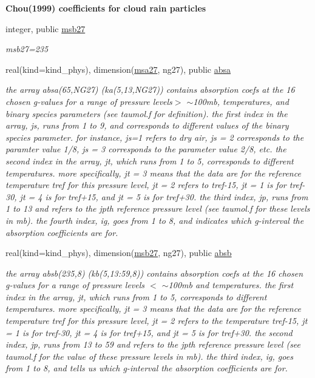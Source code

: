 \begin{Indent}\textbf{ Chou(1999) coefficients for cloud rain particles}\par
\begin{DoxyCompactItemize}
\item 
integer, public \hyperlink{group__module__radsw__kgbnn_ga3b2e57a0d4596aead5cad5aaca74850d}{msb27}
\begin{DoxyCompactList}\small\item\em msb27=235 \end{DoxyCompactList}\item 
real(kind=kind\+\_\+phys), dimension(\hyperlink{namespacemodule__radsw__kgb27_abdab838f66aba14b64bce733f797cf26}{msa27}, ng27), public \hyperlink{group__module__radsw__kgbnn_gaaf6ba2ea0beacba67c045a10d7a6a782}{absa}
\begin{DoxyCompactList}\small\item\em the array absa(65,\+N\+G27) (ka(5,13,\+N\+G27)) contains absorption coefs at the 16 chosen g-\/values for a range of pressure levels$>$ $\sim$100mb, temperatures, and binary species parameters (see taumol.\+f for definition). the first index in the array, js, runs from 1 to 9, and corresponds to different values of the binary species parameter. for instance, js=1 refers to dry air, js = 2 corresponds to the paramter value 1/8, js = 3 corresponds to the parameter value 2/8, etc. the second index in the array, jt, which runs from 1 to 5, corresponds to different temperatures. more specifically, jt = 3 means that the data are for the reference temperature tref for this pressure level, jt = 2 refers to tref-\/15, jt = 1 is for tref-\/30, jt = 4 is for tref+15, and jt = 5 is for tref+30. the third index, jp, runs from 1 to 13 and refers to the jpth reference pressure level (see taumol.\+f for these levels in mb). the fourth index, ig, goes from 1 to 8, and indicates which g-\/interval the absorption coefficients are for. \end{DoxyCompactList}\item 
real(kind=kind\+\_\+phys), dimension(\hyperlink{group__module__radsw__kgbnn_ga3b2e57a0d4596aead5cad5aaca74850d}{msb27}, ng27), public \hyperlink{group__module__radsw__kgbnn_ga8edb349c908e6950e0d18f293dd1b6ea}{absb}
\begin{DoxyCompactList}\small\item\em the array absb(235,8) (kb(5,13\+:59,8)) contains absorption coefs at the 16 chosen g-\/values for a range of pressure levels $<$ $\sim$100mb and temperatures. the first index in the array, jt, which runs from 1 to 5, corresponds to different temperatures. more specifically, jt = 3 means that the data are for the reference temperature tref for this pressure level, jt = 2 refers to the temperature tref-\/15, jt = 1 is for tref-\/30, jt = 4 is for tref+15, and jt = 5 is for tref+30. the second index, jp, runs from 13 to 59 and refers to the jpth reference pressure level (see taumol.\+f for the value of these pressure levels in mb). the third index, ig, goes from 1 to 8, and tells us which g-\/interval the absorption coefficients are for. \end{DoxyCompactList}\item 

\end{DoxyCompactItemize}
\end{Indent}
